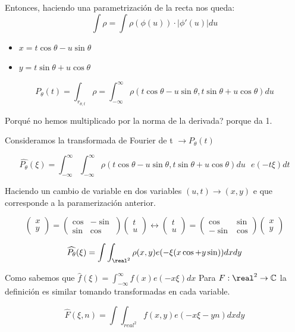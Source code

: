 	Entonces, haciendo una parametrización de la recta nos queda:
	$$\int \rho = \int \rho (\phi(u)) \cdot |\phi '(u)| du$$
	\begin{itemize}
		\item $x = t\cos\theta - u \sin\theta$
		\item $y = t\sin\theta + u \cos\theta$
	\end{itemize}
	
	$$P_{\theta} (t) = \int_{r_{\theta , t}} \rho = \int_{-\infty}^{\infty} \rho ( t\cos\theta - u\sin\theta , t\sin\theta + u\cos\theta) du$$
	
	Porqué no hemos multiplicado por la norma de la derivada? porque da 1.
	
	Consideramos la transformada de Fourier de t $\rightarrow P_{\theta}(t)$
	
	$$\widehat{P_{\theta}}(\xi) = \int_{-\infty}^{\infty} \int_{-\infty}^{\infty} \rho ( t\cos\theta - u\sin\theta , t\sin\theta + u\cos\theta) du\text{  }e(-t\xi) dt $$
	
	Haciendo un cambio de variable en dos variables $(u,t) \rightarrow (x,y)$ e que corresponde a la paramerización anterior.
	
	$$\left(\begin{matrix}
		x\\
		y
	\end{matrix} \right) = \left( \begin{matrix}
	\cos & -\sin\\
	\sin & \cos
	\end{matrix}\right)\left(\begin{matrix}
	t\\
	u
	\end{matrix}\right) \longleftrightarrow \left(\begin{matrix}
	t\\
	u
	\end{matrix} \right) = \left( \begin{matrix}
	\cos & \sin\\
	-\sin & \cos
	\end{matrix}\right)\left(\begin{matrix}
	x\\
	y
	\end{matrix}\right)$$
	
	$$\widehat{P_{\theta}}(\xi) = \int\int_{\real^2} \rho(x,y) e(-\xi(x\cos + y\sin)) dxdy$$
	
	\obs Como sabemos que $\widehat{f}(\xi) = \int_{-\infty}^{\infty} f(x) e(-x\xi)dx$ Para $F : \real^2 \rightarrow \mathbb{C}$ la definición es similar tomando transformadas en cada variable.
	
	$$\widehat{F}(\xi , n) = \int \int_{real^2} f(x,y) e (-x\xi -yn) dxdy$$
	
	
